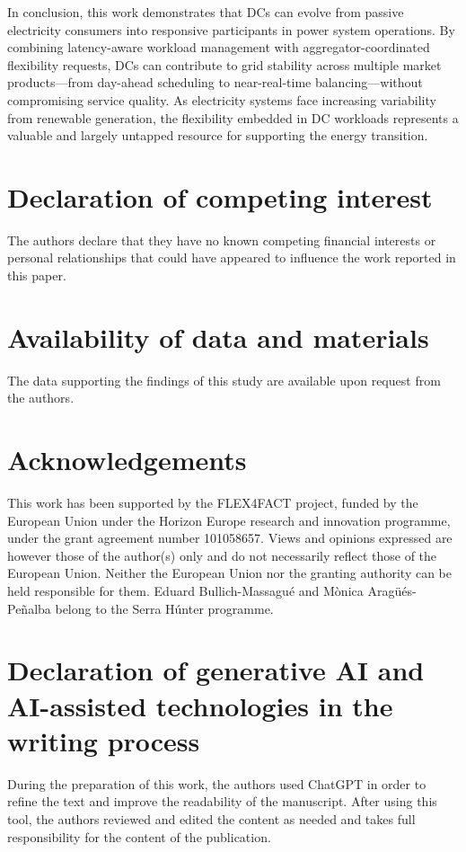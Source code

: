 \documentclass[preprint,12pt]{elsarticle}
\begin{document}
In conclusion, this work demonstrates that DCs can evolve from passive electricity consumers into responsive participants in power system operations. By combining latency-aware workload management with aggregator-coordinated flexibility requests, DCs can contribute to grid stability across multiple market products—from day-ahead scheduling to near-real-time balancing—without compromising service quality. As electricity systems face increasing variability from renewable generation, the flexibility embedded in DC workloads represents a valuable and largely untapped resource for supporting the energy transition.


\section*{Declaration of competing interest}
The authors declare that they have no known competing financial interests or personal relationships that could have appeared to influence the work reported in this paper.

\section*{Availability of data and materials}
The data supporting the findings of this study are available upon request from the authors.

\section*{Acknowledgements}
This work has been supported by the FLEX4FACT project, funded by the European Union under the Horizon Europe research and innovation programme, under the grant agreement number 101058657. Views and opinions expressed are however those of the author(s) only and do not necessarily reflect those of the European Union. Neither the European Union nor the granting authority can be held responsible for them. Eduard Bullich-Massagué and M\`{o}nica Arag\"{u}\'{e}s-Pe\~{n}alba belong to the Serra Húnter programme.



\section*{Declaration of generative AI and AI-assisted technologies in the writing process}
During the preparation of this work, the authors used ChatGPT in order to refine the text and improve the readability of the manuscript. After using this tool, the authors reviewed and edited the content as needed and takes full responsibility for the content of the publication.


\end{document}
